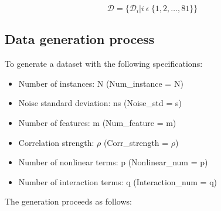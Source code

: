 \documentclass{article}
\begin{document}
$$\mathcal{D = \{}\mathcal{D}_{i}|i\ \epsilon\ \{ 1,2,\ldots,81\}\}$$

\subsection{Data generation process}

To generate a dataset with the following specifications:

\begin{itemize}
    \item Number of instances: N (Num\_instance = N)
    \item Noise standard deviation: ns (Noise\_std = s)
    \item Number of features: m (Num\_feature = m)
    \item Correlation strength: $\rho$ (Corr\_strength = $\rho$)
    \item Number of nonlinear terms: p (Nonlinear\_num = p)
    \item Number of interaction terms: q (Interaction\_num = q)
\end{itemize}

The generation proceeds as follows:
\end{document}
